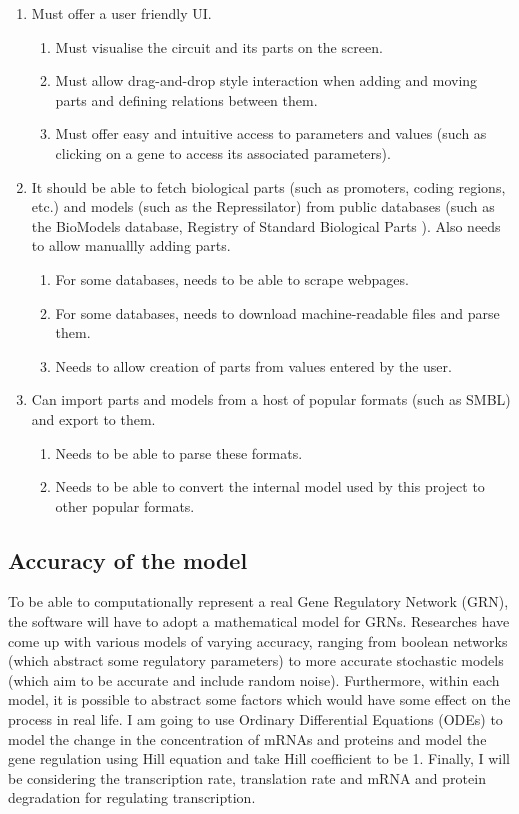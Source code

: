 \documentclass{article}
\begin{document}
\begin{enumerate}
			\item Must offer a user friendly UI.
			\begin{enumerate}
				\item Must visualise the circuit and its parts on the screen.
				\item Must allow drag-and-drop style interaction when adding and moving parts and defining relations between them.
				\item Must offer easy and intuitive access to parameters and values (such as clicking on a gene to access its associated parameters).
			\end{enumerate}
		
			\item It should be able to fetch biological parts (such as promoters, coding regions, etc.) and models (such as the Repressilator) from public databases (such as the BioModels\cite{biomodels} database, Registry of Standard Biological Parts \cite{rsbp}). Also needs to allow manuallly adding parts.
			\begin{enumerate}
				\item For some databases, needs to be able to scrape webpages.
				\item For some databases, needs to download machine-readable files and parse them.
				\item Needs to allow creation of parts from values entered by the user.
			\end{enumerate}
			
			\item Can import parts and models from a host of popular formats (such as SMBL) and export to them.
			\begin{enumerate}
				\item Needs to be able to parse these formats.
				\item Needs to be able to convert the internal model used by this project to other popular formats.
			\end{enumerate}
	
		\end{enumerate}
	
	\subsection{Accuracy of the model}
	\par To be able to computationally represent a real Gene Regulatory Network (GRN), the software will have to adopt a mathematical model for GRNs. Researches have come up with various models of varying accuracy, ranging from boolean networks (which abstract some regulatory parameters) 
	to more accurate stochastic models (which aim to be accurate and include random noise).
	Furthermore, within each model, it is possible to abstract some factors which would have some effect on the process in real life. I am going to use Ordinary Differential Equations (ODEs) 
	to model the change in the concentration of mRNAs and proteins and model the gene regulation using Hill equation
	and take Hill coefficient to be 1. Finally, I will be considering the transcription rate, translation rate and mRNA and protein degradation for regulating transcription.
	
\end{document}

